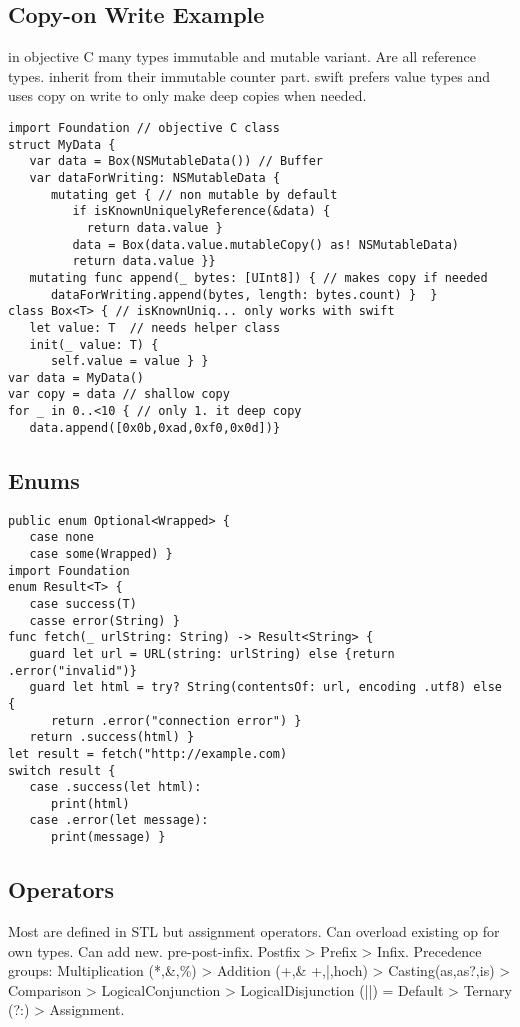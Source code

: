\subsection{Copy-on Write Example}
in objective C many types immutable and mutable variant. Are all reference types. inherit from their immutable counter part. swift prefers value types and uses copy on write to only make deep copies when needed.
\begin{lstlisting}
import Foundation // objective C class
struct MyData {
   var data = Box(NSMutableData()) // Buffer
   var dataForWriting: NSMutableData {
      mutating get { // non mutable by default
         if isKnownUniquelyReference(&data) {
           return data.value }
         data = Box(data.value.mutableCopy() as! NSMutableData)
         return data.value }}
   mutating func append(_ bytes: [UInt8]) { // makes copy if needed
      dataForWriting.append(bytes, length: bytes.count) }  }
class Box<T> { // isKnownUniq... only works with swift
   let value: T  // needs helper class
   init(_ value: T) {
      self.value = value } }
var data = MyData()
var copy = data // shallow copy
for _ in 0..<10 { // only 1. it deep copy
   data.append([0x0b,0xad,0xf0,0x0d])}
\end{lstlisting}

\subsection{Enums}
\begin{lstlisting}
public enum Optional<Wrapped> {
   case none
   case some(Wrapped) }
import Foundation
enum Result<T> {
   case success(T)
   casse error(String) }
func fetch(_ urlString: String) -> Result<String> {
   guard let url = URL(string: urlString) else {return .error("invalid")}
   guard let html = try? String(contentsOf: url, encoding .utf8) else {
      return .error("connection error") }
   return .success(html) }
let result = fetch("http://example.com)
switch result {
   case .success(let html):
      print(html)
   case .error(let message):
      print(message) }
\end{lstlisting}

\subsection{Operators}
Most are defined in STL but assignment operators. Can overload existing op for own types. Can add new. pre-post-infix.
Postfix > Prefix > Infix. Precedence groups: Multiplication (*,\&,\%) > Addition (+,\& +,|,hoch) > Casting(as,as?,is) > Comparison > LogicalConjunction > LogicalDisjunction (||)  = Default >  Ternary (?:) > Assignment.

